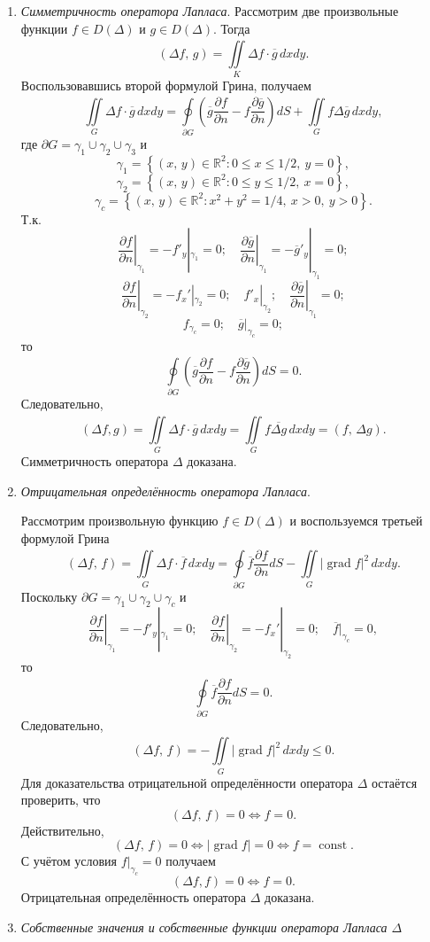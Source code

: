 \documentclass[a4paper]{article}
\begin{document}
\begin{sol}
\begin{enumerate}
\item \emph{Симметричность оператора Лапласа}. Рассмотрим
	две произвольные функции $f \in D(\Delta)$ и $g \in D(\Delta)$. Тогда
	\[
		(\Delta f,\,g)= \iint\limits_{K}^{}  \Delta
		f \cdot \overline{g}\,dx dy
	.\] 
Воспользовавшись второй формулой Грина, получаем
\[
\iint\limits_{G}^{}  \Delta f \cdot \overline{g} \, dx dy=
\oint\limits_{\partial G}^{} \left( \overline{g} \frac{\partial f}{\partial n}- f \frac{\partial \overline{g}}{\partial n} \right) dS+ \iint\limits_{G}^{}   f \Delta \overline{g} \, dx dy
,\] 
где $\partial G=\gamma_1 \cup \gamma_2 \cup \gamma_3$ и
\[
	\gamma_1= \left\{ (x,\,y)\in \mathbb{R}^2\colon 
	0\le x\le 1 /2,\ y=0\right\} 
 ,\]
\[
	\gamma_2=\left\{ (x,\,y) \in \mathbb{R}^2\colon 
	0\le y\le 1 /2,\ x=0\right\} 
 ,\]
\[
	\gamma_c= \left\{ (x,\,y) \in \mathbb{R}^2\colon 
	x^2+y^2= 1/4,\ x>0,\ y>0\right\} 
.\] 
Т.\:к.
\[
\left. \frac{\partial f}{\partial n}  \right|_{\gamma_1}=
	-f'_y|_{\gamma_1}=0;\quad \left. \frac{\partial \overline{g}}{\partial n}  \right|_{\gamma_1}=- \overline{g}'_y|_{\gamma_1}=0;
\]
\[
\left. \frac{\partial f}{\partial n}  \right|_{\gamma_2}=
	-f_x'|_{\gamma_2}=0;\quad f'_x|_{\gamma_2};\quad \left. \frac{\partial \overline{g}}{\partial n}  \right|_{\gamma_1}=0;\] 
		\[
			f_{\gamma_c}=0;\quad \overline{g}|_{\gamma_c}=0;
		\]
то
\[
	\oint\limits_{\partial G}^{} \left( \overline{g}
	\frac{\partial f}{\partial n} -f \frac{\partial \overline{g}}{\partial n}\right) dS=0 
.\] 
Следовательно,
\[
	(\Delta f,g)= \iint\limits_{G}^{} \Delta f \cdot \overline{g}\, dx dy= \iint\limits_{G}^{} f \overline{\Delta g}\,dx dy=
	(f,\,\Delta g)
.\] 
Симметричность оператора $\Delta$ доказана.
\item \emph{Отрицательная определённость оператора Лапласа}.

	Рассмотрим произвольную функцию $f \in D(\Delta)$ и воспользуемся третьей формулой Грина
\[
	(\Delta f,\,f)= \iint\limits_{G}^{}  \Delta f \cdot
	\overline{f} \, dx dy= \oint\limits_{\partial G}^{} 
	\overline{f} \frac{\partial f}{\partial n} dS-
	\iint\limits_{G}^{} |\operatorname{grad} f|^2\, dx dy 
.\] 
Поскольку $\partial G= \gamma_1 \cup \gamma_2 \cup \gamma_c$ и
\[
\left. \frac{\partial f}{\partial n}  \right|_{\gamma_1}=
	-f'_y|_{\gamma_1}=0;\quad 
	\left. \frac{\partial f}{\partial n}  \right|_{\gamma_2}=
		-f_x'|_{\gamma_2}=0;
		\quad \overline{f}|_{\gamma_c}=0
 ,\]
то
\[
\oint\limits_{\partial G}^{} \overline{f} \frac{\partial f}{\partial n} dS=0 
.\] 
Следовательно,
\[
	(\Delta f,\,f)= - \iint\limits_{G}^{} |\operatorname{grad}  f|^2\,dxdy\le 0
.\] 
Для доказательства отрицательной определённости оператора $\Delta$ остаётся проверить, что
\[
	(\Delta f,\,f)=0 \Leftrightarrow f=0
.\] 
Действительно,
\[
	(\Delta f,\,f)=0 \Leftrightarrow |\operatorname{grad} f|
	=0 \Leftrightarrow f = \operatorname{const}
.\] 
С учётом условия $f|_{\gamma_c}=0$ получаем
\[
	(\Delta f,f)=0 \Leftrightarrow f=0
.\] 
Отрицательная определённость оператора $\Delta$ доказана.
\item \emph{Собственные значения и собственные функции оператора
	Лапласа $\Delta$}


\end{enumerate}
\end{sol}
\end{document}
